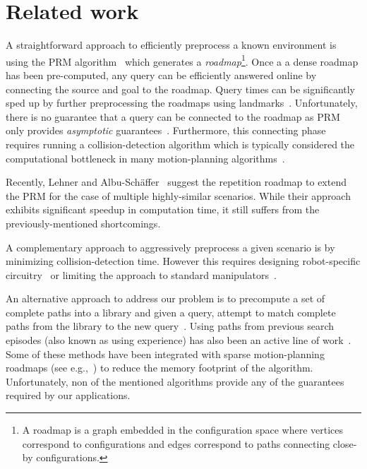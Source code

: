 \documentclass[letterpaper]{article} %
\begin{document}

\section{Related work}
\label{sec:rel}
A straightforward approach to efficiently preprocess a known environment is using the \textsf{PRM} algorithm~\cite{kavraki1996probabilistic} which generates a \emph{roadmap}\footnote{A roadmap is a graph embedded in the configuration space where vertices correspond to configurations and edges correspond to paths connecting close-by configurations.}.
Once a a dense roadmap has been pre-computed, any query can be efficiently answered online by connecting the source and goal to the roadmap. 
Query times can be significantly sped up by further preprocessing the roadmaps using landmarks~\cite{paden2017landmark}.
Unfortunately, there is no guarantee that a query can be connected to the roadmap as \textsf{PRM} only provides \emph{asymptotic} guarantees~\cite{KKL98}.
Furthermore, this connecting phase requires running a collision-detection algorithm which is typically considered the computational bottleneck in many motion-planning algorithms~\cite{L06}.

Recently, Lehner and  Albu{-}Sch{\"{a}}ffer~\cite{LA18} suggest the repetition roadmap to extend the \textsf{PRM} for the case of multiple highly-similar scenarios.
While their approach exhibits significant speedup in computation time, it still suffers from the previously-mentioned shortcomings.

A complementary approach to aggressively preprocess a given scenario is by minimizing collision-detection time.
However this requires designing robot-specific
circuitry~\cite{MFQSK16}
or limiting the approach to standard manipulators~\cite{YMILV18}.

An alternative approach to address our problem is to precompute a set of complete paths into a library and given a query, attempt to match complete paths from the library to the new query~\cite{berenson2012robot,jetchev2013fast}.
Using paths from previous search episodes (also known as using experience) has also been an active line of work~\cite{PCCL12,PDCL13,BAG12,CSMOC15}.
Some of these methods have been integrated with sparse motion-planning roadmaps (see e.g.,~\cite{SSAH14,DB14}) to reduce the memory footprint of the algorithm.
Unfortunately, non of the mentioned algorithms provide any of the guarantees required by our applications.
\end{document}
